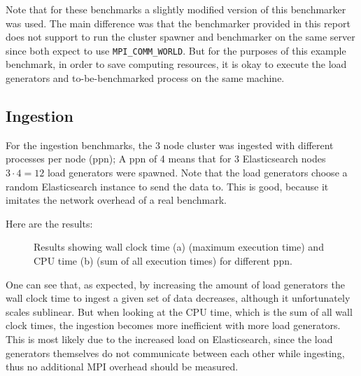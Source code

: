 Note that for these benchmarks a slightly modified version of this benchmarker was used. The main difference was that the benchmarker provided in this report does not support to run the cluster spawner and benchmarker on the same server since both expect to use \texttt{MPI\_COMM\_WORLD}. But for the purposes of this example benchmark, in order to save computing resources, it is okay to execute the load generators and to-be-benchmarked process on the same machine.

\subsection{Ingestion}
For the ingestion benchmarks, the 3 node cluster was ingested with different processes per node (ppn); A ppn of 4 means that for 3 Elasticsearch nodes $3 \cdot 4 = 12$ load generators were spawned. Note that the load generators choose a random Elasticsearch instance to send the data to. This is good, because it imitates the network overhead of a real benchmark.

Here are the results:
\begin{figure}[H]%
    \centering
    \qquad
    \caption{Results showing wall clock time (a) (maximum execution time) and CPU time (b) (sum of all execution times) for different ppn.}%
\end{figure}

One can see that, as expected, by increasing the amount of load generators the wall clock time to ingest a given set of data decreases, although it unfortunately scales sublinear. But when looking at the CPU time, which is the sum of all wall clock times, the ingestion becomes more inefficient with more load generators. This is most likely due to the increased load on Elasticsearch, since the load generators themselves do not communicate between each other while ingesting, thus no additional MPI overhead should be measured.

